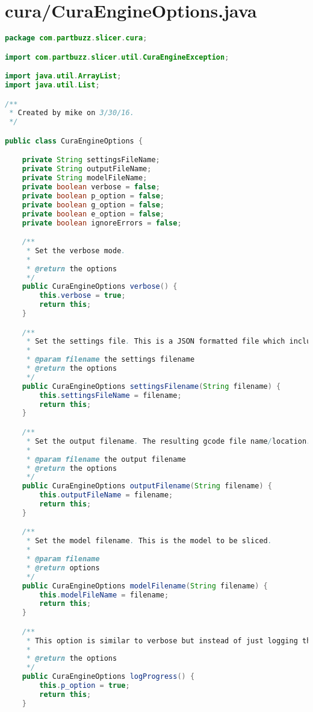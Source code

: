 \section{cura/CuraEngineOptions.java}
\begin{lstlisting}[language=Java, label={lst:CuraEngineOptions}, caption=All arguments to the CuraEngine C++ executeable must be compiled before it can be executed. This code is the compiler for that argument list.]
package com.partbuzz.slicer.cura;

import com.partbuzz.slicer.util.CuraEngineException;

import java.util.ArrayList;
import java.util.List;

/**
 * Created by mike on 3/30/16.
 */

public class CuraEngineOptions {

    private String settingsFileName;
    private String outputFileName;
    private String modelFileName;
    private boolean verbose = false;
    private boolean p_option = false;
    private boolean g_option = false;
    private boolean e_option = false;
    private boolean ignoreErrors = false;

    /**
     * Set the verbose mode.
     *
     * @return the options
     */
    public CuraEngineOptions verbose() {
        this.verbose = true;
        return this;
    }

    /**
     * Set the settings file. This is a JSON formatted file which includes all needed information for slicing the file.
     *
     * @param filename the settings filename
     * @return the options
     */
    public CuraEngineOptions settingsFilename(String filename) {
        this.settingsFileName = filename;
        return this;
    }

    /**
     * Set the output filename. The resulting gcode file name/location.
     *
     * @param filename the output filename
     * @return the options
     */
    public CuraEngineOptions outputFilename(String filename) {
        this.outputFileName = filename;
        return this;
    }

    /**
     * Set the model filename. This is the model to be sliced.
     *
     * @param filename
     * @return options
     */
    public CuraEngineOptions modelFilename(String filename) {
        this.modelFileName = filename;
        return this;
    }

    /**
     * This option is similar to verbose but instead of just logging the output to the screen it logs the output to the CuraEngine log files.
     *
     * @return the options
     */
    public CuraEngineOptions logProgress() {
        this.p_option = true;
        return this;
    }


\end{lstlisting}
